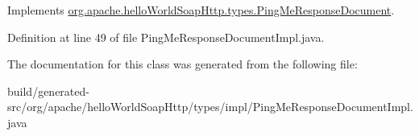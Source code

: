 Implements \hyperlink{interfaceorg_1_1apache_1_1hello_world_soap_http_1_1types_1_1_ping_me_response_document_a95664d120e97fbf7944c277b73b69c25}{org.\+apache.\+hello\+World\+Soap\+Http.\+types.\+Ping\+Me\+Response\+Document}.



Definition at line 49 of file Ping\+Me\+Response\+Document\+Impl.\+java.



The documentation for this class was generated from the following file\+:\begin{DoxyCompactItemize}
\item 
build/generated-\/src/org/apache/hello\+World\+Soap\+Http/types/impl/Ping\+Me\+Response\+Document\+Impl.\+java\end{DoxyCompactItemize}
